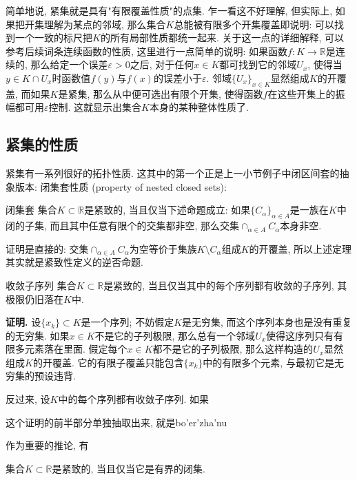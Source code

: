 简单地说, 紧集就是具有"有限覆盖性质"的点集. 乍一看这不好理解, 但实际上, 如果把开集理解为某点的邻域, 那么集合$K$总能被有限多个开集覆盖即说明: 可以找到一个一致的标尺把$K$的所有局部性质都统一起来. 关于这一点的详细解释, 可以参考后续词条连续函数的性质, 这里进行一点简单的说明: 如果函数$f:K\to\mathbb{R}$是连续的, 那么给定一个误差$\varepsilon>0$之后, 对于任何$x\in K$都可找到它的邻域$U_{x}$, 使得当$y\in K\cap U_x$时函数值$f(y)$与$f(x)$的误差小于$\varepsilon$. 邻域$\{U_x\}_{x\in K}$显然组成$K$的开覆盖, 而如果$K$是紧集, 那么从中便可选出有限个开集, 使得函数$f$在这些开集上的振幅都可用$\varepsilon$控制. 这就显示出集合$K$本身的某种整体性质了.

\subsection{紧集的性质}
紧集有一系列很好的拓扑性质. 这其中的第一个正是上一小节例子中闭区间套的抽象版本: 闭集套性质 (property of nested closed sets):

\begin{theorem}{闭集套}
集合$K\subset\mathbb{R}$是紧致的, 当且仅当下述命题成立: 如果$\{C_\alpha\}_{\alpha\in A}$是一族在$K$中闭的子集, 而且其中任意有限个的交集都非空, 那么交集$\cap_{\alpha\in A}C_\alpha$本身非空. 
\end{theorem}

证明是直接的: 交集$\cap_{\alpha\in A}C_\alpha$为空等价于集族$K\setminus C_\alpha$组成$K$的开覆盖, 所以上述定理其实就是紧致性定义的逆否命题.

\begin{theorem}{收敛子序列}
集合$K\subset\mathbb{R}$是紧致的, 当且仅当其中的每个序列都有收敛的子序列, 其极限仍旧落在$K$中.
\end{theorem}

\textbf{证明.} 设$\{x_k\}\subset K$是一个序列; 不妨假定$K$是无穷集, 而这个序列本身也是没有重复的无穷集. 如果$x\in K$不是它的子列极限, 那么总有一个邻域$U_x$使得这序列只有有限多元素落在里面. 假定每个$x\in K$都不是它的子列极限, 那么这样构造的$U_x$显然组成$K$的开覆盖. 它的有限子覆盖只能包含$\{x_k\}$中的有限多个元素, 与最初它是无穷集的预设违背.

反过来, 设$K$中的每个序列都有收敛子序列. 如果

这个证明的前半部分单独抽取出来, 就是bo'er'zha'nu

作为重要的推论, 有
\begin{theorem}{}
集合$K\subset\mathbb{R}$是紧致的, 当且仅当它是有界的闭集.
\end{theorem}